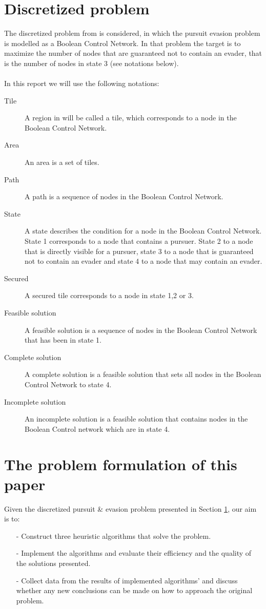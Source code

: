 \section{Discretized problem}\label{discretizedproblem}
The discretized problem from \cite{paper1} is considered, in which the pursuit evasion problem is modelled as a Boolean Control Network. In that problem the target is to maximize the number of nodes that are guaranteed not to contain an evader, that is the number of nodes in state 3 (see notations below).\\
\\
In this report we will use the following notations:
\begin{description}
\item[Tile] A region in \cite{paper1} will be called a tile, which corresponds to a node in the Boolean Control Network.
\item[Area]An area is a set of tiles.
\item[Path]A path is a sequence of nodes in the Boolean Control Network.
\item[State]A state describes the condition for a node in the Boolean Control Network. State 1 corresponds to a node that contains a pursuer. State 2 to a node that is directly visible for a pursuer, state 3 to a node that is guaranteed not to contain an evader and state 4 to a node that may contain an evader.
\item[Secured]A secured tile corresponds to a node in state 1,2 or 3.
\item[Feasible solution]A feasible solution is a sequence of nodes in the Boolean Control Network that has been in state 1.
\item[Complete solution]A complete solution is a feasible solution that sets all nodes in the Boolean Control Network to state 4.
\item[Incomplete solution]An incomplete solution is a feasible solution that contains nodes in the Boolean Control network which are in state 4.
\end{description}

\section{The problem formulation of this paper}
Given the discretized pursuit \& evasion problem presented in Section \ref{discretizedproblem}, our aim is to:
\begin{enumerate}
\item[-] Construct three heuristic algorithms that solve the problem.
\item[-] Implement the algorithms and evaluate their efficiency and the quality of the solutions presented.
\item[-] Collect data from the results of implemented algorithms' and discuss whether any new conclusions can be made on how to approach the original problem.
\end{enumerate}

